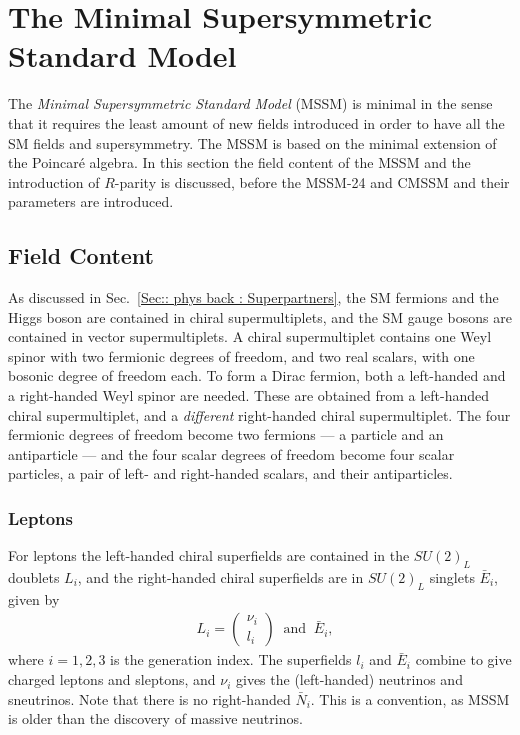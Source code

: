 \documentclass[twoside,english]{uiofysmaster}
\begin{document}
\section{The Minimal Supersymmetric Standard Model}

The \textit{Minimal Supersymmetric Standard Model} (MSSM) is minimal in the sense that it requires the least amount of new fields introduced in order to have all the SM fields and supersymmetry. The MSSM is based on the minimal extension of the Poincar\'{e} algebra. In this section the field content of the MSSM and the introduction of $R$-parity is discussed, before the MSSM-24 and CMSSM and their parameters are introduced.  


\subsection{Field Content}

As discussed in Sec.~\ref{Sec:: phys back : Superpartners}, the SM fermions and the Higgs boson are contained in chiral supermultiplets, and the SM gauge bosons are contained in vector supermultiplets. A chiral supermultiplet contains one Weyl spinor with two fermionic degrees of freedom, and two real scalars, with one bosonic degree of freedom each. To form a Dirac fermion, both a left-handed and a right-handed Weyl spinor are needed. These are obtained from a left-handed chiral supermultiplet, and a \textit{different} right-handed chiral supermultiplet. The four fermionic degrees of freedom become two fermions --- a particle and an antiparticle --- and the four scalar degrees of freedom become four scalar particles, a pair of left- and right-handed scalars, and their antiparticles.  

\subsubsection{Leptons}

For leptons the left-handed chiral superfields are contained in the $SU(2)_L$ doublets $L_i$, and the right-handed chiral superfields are in $SU(2)_L$ singlets $\bar{E}_i$, given by 
\begin{align}
&L_i = \begin{pmatrix}
\nu_i\\
l_i
\end{pmatrix}
~\text{ and } ~
\bar{E}_i,
\end{align}
where $i=1,2,3$ is the generation index. The superfields $l_i$ and $\bar{E}_i$ combine to give charged leptons and sleptons, and $\nu_i$ gives the (left-handed) neutrinos and sneutrinos. Note that there is no right-handed $\bar{N}_i$. This is a convention, as MSSM is older than the discovery of massive neutrinos. 
\end{document}
